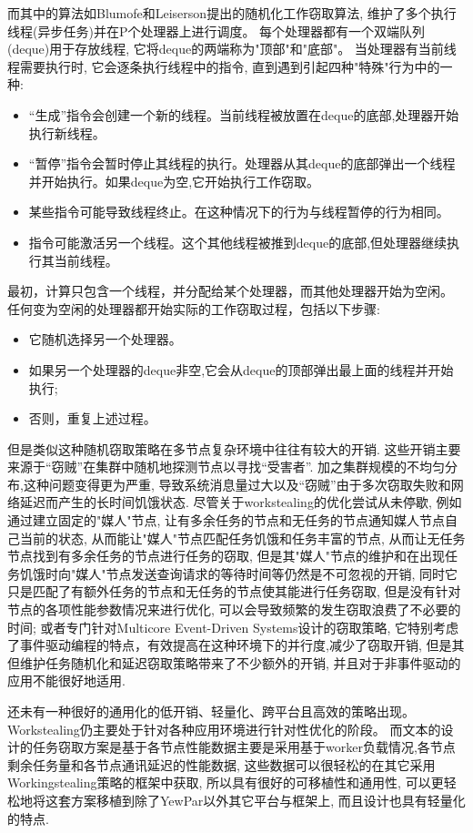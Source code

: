 \documentclass{mproj}
\begin{document}
而其中的算法如Blumofe和Leiserson提出的随机化工作窃取算法,
维护了多个执行线程(异步任务)并在P个处理器上进行调度\cite{10.1145/324133.324234}。
每个处理器都有一个双端队列(deque)用于存放线程,
它将deque的两端称为"顶部"和"底部"。
当处理器有当前线程需要执行时,
它会逐条执行线程中的指令,
直到遇到引起四种"特殊"行为中的一种:
\begin{itemize}
    \item “生成”指令会创建一个新的线程。当前线程被放置在deque的底部,处理器开始执行新线程。
    \item “暂停”指令会暂时停止其线程的执行。处理器从其deque的底部弹出一个线程并开始执行。如果deque为空,它开始执行工作窃取。
    \item 某些指令可能导致线程终止。在这种情况下的行为与线程暂停的行为相同。
    \item 指令可能激活另一个线程。这个其他线程被推到deque的底部,但处理器继续执行其当前线程。
\end{itemize}
最初，计算只包含一个线程，并分配给某个处理器，而其他处理器开始为空闲。
任何变为空闲的处理器都开始实际的工作窃取过程，包括以下步骤:
\begin{itemize}
    \item 它随机选择另一个处理器。
    \item 如果另一个处理器的deque非空,它会从deque的顶部弹出最上面的线程并开始执行;
    \item 否则，重复上述过程。
\end{itemize}

但是类似这种随机窃取策略在多节点复杂环境中往往有较大的开销.
这些开销主要来源于“窃贼”在集群中随机地探测节点以寻找“受害者”.
加之集群规模的不均匀分布,这种问题变得更为严重,
导致系统消息量过大以及“窃贼”由于多次窃取失败和网络延迟而产生的长时间饥饿状态.
尽管关于workstealing的优化尝试从未停歇,
例如通过建立固定的"媒人"节点,
让有多余任务的节点和无任务的节点通知媒人节点自己当前的状态,
从而能让"媒人"节点匹配任务饥饿和任务丰富的节点,
从而让无任务节点找到有多余任务的节点进行任务的窃取\cite{10.1145/2851141.2851175},
但是其"媒人"节点的维护和在出现任务饥饿时向"媒人"节点发送查询请求的等待时间等仍然是不可忽视的开销,
同时它只是匹配了有额外任务的节点和无任务的节点使其能进行任务窃取,
但是没有针对节点的各项性能参数情况来进行优化,
可以会导致频繁的发生窃取浪费了不必要的时间;
或者专门针对Multicore Event-Driven Systems设计的窃取策略\cite{5541655},
它特别考虑了事件驱动编程的特点，有效提高在这种环境下的并行度,减少了窃取开销,
但是其但维护任务随机化和延迟窃取策略带来了不少额外的开销,
并且对于非事件驱动的应用不能很好地适用.

还未有一种很好的通用化的低开销、轻量化、跨平台且高效的策略出现。
Workstealing仍主要处于针对各种应用环境进行针对性优化的阶段。
而文本的设计的任务窃取方案是基于各节点性能数据主要是采用基于worker负载情况,各节点剩余任务量和各节点通讯延迟的性能数据,
这些数据可以很轻松的在其它采用Workingstealing策略的框架中获取,
所以具有很好的可移植性和通用性,
可以更轻松地将这套方案移植到除了YewPar以外其它平台与框架上,
而且设计也具有轻量化的特点.
\end{document}

